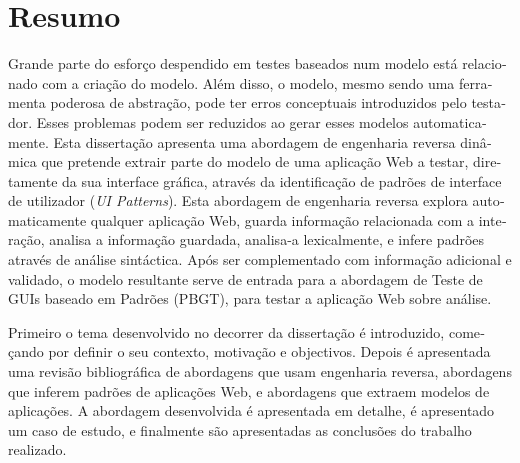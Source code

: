 \chapter*{Resumo}
\begin{otherlanguage}{portuguese}
Grande parte do esforço despendido em testes baseados num modelo está relacionado com a criação do modelo. Além disso, o modelo, mesmo sendo uma ferramenta poderosa de abstração, pode ter erros conceptuais introduzidos pelo testador. Esses problemas podem ser reduzidos ao gerar esses modelos automaticamente. Esta dissertação apresenta uma abordagem de engenharia reversa dinâmica que pretende extrair parte do modelo de uma aplicação Web a testar, diretamente da sua interface gráfica, através da identificação de padrões de interface de utilizador (\textit{UI Patterns}). Esta abordagem de engenharia reversa explora automaticamente qualquer aplicação Web, guarda informação relacionada com a interação, analisa a informação guardada, analisa-a lexicalmente, e infere padrões através de análise sintáctica. Após ser complementado com informação adicional e validado, o modelo resultante serve de entrada para a abordagem de Teste de GUIs baseado em Padrões (PBGT), para testar a aplicação Web sobre análise.

Primeiro o tema desenvolvido no decorrer da dissertação é introduzido, começando por definir o seu contexto, motivação e objectivos. Depois é apresentada uma revisão bibliográfica de abordagens que usam engenharia reversa, abordagens que inferem padrões de aplicações Web, e abordagens que extraem modelos de aplicações.  A abordagem desenvolvida é apresentada em detalhe, é apresentado um caso de estudo, e finalmente são apresentadas as conclusões do trabalho realizado.
\end{otherlanguage}